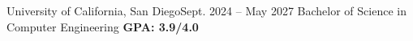 \resumeSubHeadingListStart
  \resumeSubheading
    {University of California, San Diego}{Sept. 2024 -- May 2027}
    {Bachelor of Science in Computer Engineering}{ \textbf{GPA: 3.9/4.0}}
    \resumeItemListStart
    \vspace{-4pt}
    \resumeItemListEnd
\resumeSubHeadingListEnd
